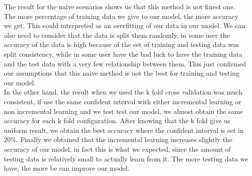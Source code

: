 The result for the naive scenarios shows us that this method is not finest one. The more percentage of training data we give to our model, the more accuracy we get. This could interpreted as an overfitting of our data in our model. We can also need to consider that the data is split them randomly, in some user the accuracy of the data is high because of the set of training and testing data was split consistency, while in some user have the bad luck to have the training data and the test data with a very few relationship between them. This just confirmed our assumptions that this naive method is not the best for training and testing our model.
\\[2ex]
In the other hand, the result when we used the k fold cross validation was much consistent, if use the same confident interval with either incremental learning or non incremental learning and we test test our model, we almost obtain the same accuracy for each k fold configuration. After knowing that the k fold give us uniform result, we obtain the best accuracy where the confident interval is set in 20\%. Finally we obtained that the incremental learning increases slightly the accuracy of our model, in fact this is what we expected, since the amount of testing data is relatively small to actually learn from it. The more testing data we have, the more be can improve our model.